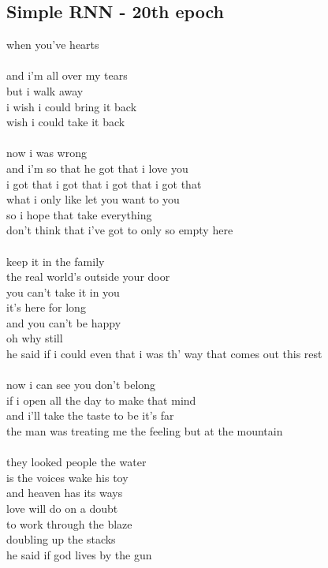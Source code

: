 \documentclass[conference]{IEEEtran}
\begin{document}
\subsection{Simple RNN - 20th epoch}\label{RNN20}
when you've hearts \\
 \\
and i'm all over my tears \\
but i walk away \\
i wish i could bring it back \\
wish i could take it back \\
 \\
now i was wrong \\
and i'm so that he got that i love you \\
i got that i got that i got that i got that \\
what i only like let you want to you \\
so i hope that take everything \\
don't think that i've got to only so empty here \\
 \\
keep it in the family \\
the real world's outside your door \\
you can't take it in you \\
it's here for long \\
and you can't be happy \\
oh why still \\
he said if i could even that i was th' way that comes out this rest \\
 \\
now i can see you don't belong \\
if i open all the day to make that mind \\
and i'll take the taste to be it's far \\
the man was treating me the feeling but at the mountain \\
 \\
they looked people the water \\
is the voices wake his toy \\
and heaven has its ways \\
love will do on a doubt \\
to work through the blaze \\
doubling up the stacks \\
he said if god lives by the gun \\
\end{document}
